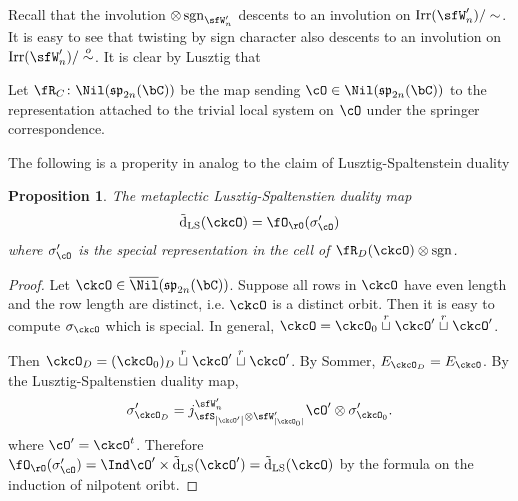 \documentclass[12pt,a4paper]{amsart}
\def\abs#1{\left|{#1}\right|}
\def\fsp{\mathfrak{sp}}
\newcommand{\sgn}{\operatorname{sgn}}
\numberwithin{equation}{section}
\newtheorem{prop}[thm]{Proposition}
\theoremstyle{remark}
\def\tdLS{\tilde{\mathrm{d}}_{\mathrm{LS}}}
\begin{document}
Recall that the involution $\otimes \sgn_{\sfW'_{n}}$ descents to an involution
on $\Irr(\sfW'_{n})/\sim$.
It is easy to see that twisting by sign character also descents to an
involution on $\Irr(\sfW'_{n})/\osim$.
It is clear by Lusztig that



Let $\RSp\colon \Nil(\fsp_{2n}(\bC))$ be the map sending
$\cO\in \Nil(\fsp_{2n}(\bC))$ to the representation attached to the trivial
local system on $\cO$ under the springer correspondence.


The following is a properity in analog to the claim of Lusztig-Spaltenstein duality
\begin{prop}
  The metaplectic Lusztig-Spaltenstien duality map
  \[
    \tdLS(\ckcO) = \SpringerO(\sigma'_{\cO})
  \]
  where $\sigma'_{\cO}$ is the special representation in the cell of $\RRD(\ckcO)\otimes \sgn$.
\end{prop}
\begin{proof}
  Let $\ckcO\in \bNilSP$.
  Suppose all rows in $\ckcO$ have even length and the row length are distinct,
  i.e. $\ckcO$ is a distinct orbit.
  Then it is easy to compute $\sigma_{\ckcO}$ which is special.
  In general, $\ckcO = \ckcO_{0}\cuprow \ckcO'\cuprow \ckcO'$.

  Then $\ckcO_{D} = (\ckcO_{0})_{D} \cuprow \ckcO'\cuprow \ckcO'$.
  By Sommer, $E_{\ckcO_{D}} = E_{\ckcO}$.
  By the Lusztig-Spaltenstien duality map,
  \[
    \sigma'_{\ckcO_{D}} = j_{\sfS_{\abs{\ckcO'}}\otimes \sfW'_{\abs{\ckcO_{0}}}}^{\sfW'_{n}}
    \cO'\otimes \sigma'_{\ckcO_{0}}.
  \]
  where $\cO' = \ckcO^{t}$.
  Therefore
  $\SpringerO(\sigma'_{\cO})  = \Ind \cO' \times \tdLS(\ckcO') = \tdLS(\ckcO)$
  by the formula on the induction of nilpotent oribt.
\end{proof}
\end{document}

